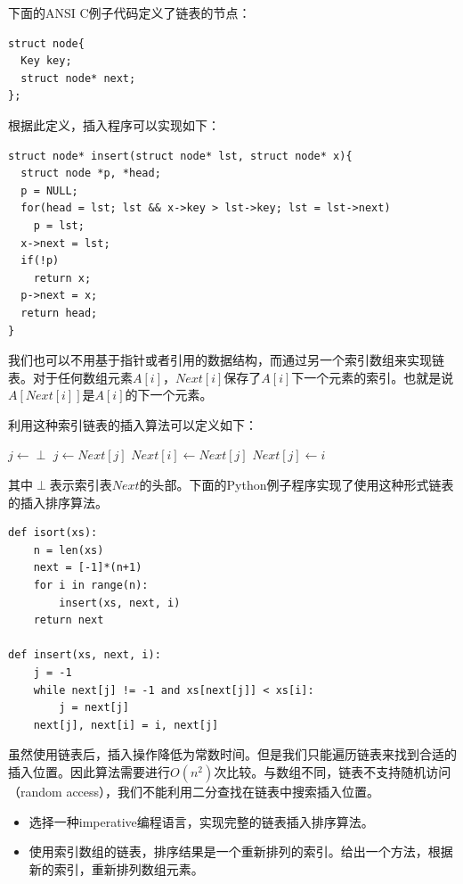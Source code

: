 \documentclass[UTF8]{article}
\begin{document}
下面的ANSI C例子代码定义了链表的节点：

\lstset{language=C}
\begin{lstlisting}
struct node{
  Key key;
  struct node* next;
};
\end{lstlisting}

根据此定义，插入程序可以实现如下：

\begin{lstlisting}
struct node* insert(struct node* lst, struct node* x){
  struct node *p, *head;
  p = NULL;
  for(head = lst; lst && x->key > lst->key; lst = lst->next)
    p = lst;
  x->next = lst;
  if(!p)
    return x;
  p->next = x;
  return head;
}
\end{lstlisting}

我们也可以不用基于指针或者引用的数据结构，而通过另一个索引数组来实现链表。对于任何数组元素$A[i]$，$Next[i]$保存了$A[i]$下一个元素的索引。也就是说$A[Next[i]]$是$A[i]$的下一个元素。

利用这种索引链表的插入算法可以定义如下：

\begin{algorithmic}
  \State $j \gets \perp$
    \State $j \gets Next[j]$
  \EndWhile
  \State $Next[i] \gets Next[j]$
  \State $Next[j] \gets i$
\EndFunction
\end{algorithmic}

其中$\perp$表示索引表$Next$的头部。下面的Python例子程序实现了使用这种形式链表的插入排序算法。

\lstset{language=Python}
\begin{lstlisting}
def isort(xs):
    n = len(xs)
    next = [-1]*(n+1)
    for i in range(n):
        insert(xs, next, i)
    return next

def insert(xs, next, i):
    j = -1
    while next[j] != -1 and xs[next[j]] < xs[i]:
        j = next[j]
    next[j], next[i] = i, next[j]
\end{lstlisting}

虽然使用链表后，插入操作降低为常数时间。但是我们只能遍历链表来找到合适的插入位置。因此算法需要进行$O(n^2)$次比较。与数组不同，链表不支持随机访问（random access），我们不能利用二分查找在链表中搜索插入位置。

\begin{Exercise}
\begin{itemize}
\item 选择一种imperative编程语言，实现完整的链表插入排序算法。
\item 使用索引数组的链表，排序结果是一个重新排列的索引。给出一个方法，根据新的索引，重新排列数组元素。
\end{itemize}
\end{Exercise}
\end{document}
